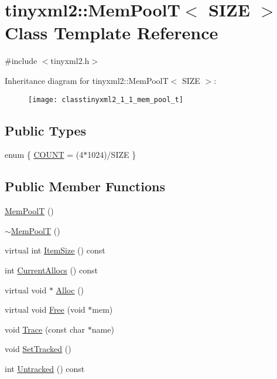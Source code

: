 \hypertarget{classtinyxml2_1_1_mem_pool_t}{\section{tinyxml2\+:\+:Mem\+Pool\+T$<$ S\+I\+Z\+E $>$ Class Template Reference}
\label{classtinyxml2_1_1_mem_pool_t}
}


{\ttfamily \#include $<$tinyxml2.\+h$>$}

Inheritance diagram for tinyxml2\+:\+:Mem\+Pool\+T$<$ S\+I\+Z\+E $>$\+:\begin{figure}[H]
\begin{center}
\leavevmode
\texttt{[image: classtinyxml2\_1\_1\_mem\_pool\_t]}
\end{center}
\end{figure}
\subsection*{Public Types}
\begin{DoxyCompactItemize}
\item 
enum \{ \hyperlink{classtinyxml2_1_1_mem_pool_t_a6a28233ef0072033f2040e5800a745c5a4eeedbaa09fc9968120af6190e9e0988}{C\+O\+U\+N\+T} = (4$\ast$1024)/\+S\+I\+Z\+E
 \}
\end{DoxyCompactItemize}
\subsection*{Public Member Functions}
\begin{DoxyCompactItemize}
\item 
\hyperlink{classtinyxml2_1_1_mem_pool_t_a8a69a269ea72e292dde65309528ef64b}{Mem\+Pool\+T} ()
\item 
\hyperlink{classtinyxml2_1_1_mem_pool_t_ad6bb8346ad5b9a34f8f0051da5e3ed3f}{$\sim$\+Mem\+Pool\+T} ()
\item 
virtual int \hyperlink{classtinyxml2_1_1_mem_pool_t_a7ec8778fe99f6e332615a703be0b48bc}{Item\+Size} () const 
\item 
int \hyperlink{classtinyxml2_1_1_mem_pool_t_a56be11b7db6a7ef00db17088a7769aab}{Current\+Allocs} () const 
\item 
virtual void $\ast$ \hyperlink{classtinyxml2_1_1_mem_pool_t_aa9d785a48ffe6ea1be679bab13464486}{Alloc} ()
\item 
virtual void \hyperlink{classtinyxml2_1_1_mem_pool_t_a4f1a0c434e9e3d7391e5c16ed4ee8c70}{Free} (void $\ast$mem)
\item 
void \hyperlink{classtinyxml2_1_1_mem_pool_t_a0bc596f271e0f139822c534238b3f244}{Trace} (const char $\ast$name)
\item 
void \hyperlink{classtinyxml2_1_1_mem_pool_t_a7798932414916199a1bc0f9c3f368521}{Set\+Tracked} ()
\item 
int \hyperlink{classtinyxml2_1_1_mem_pool_t_a524b90d0edeac41964c06510757dce0f}{Untracked} () const 
\end{DoxyCompactItemize}


